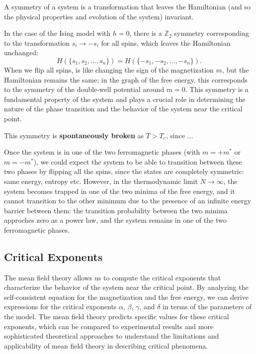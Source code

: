 \begin{remark}
    A symmetry of a system is a transformation that leaves the Hamiltonian (and so the physical properties and evolution of the system) invariant.

    In the case of the Ising model with \(h=0\), there is a \(\mathbb{Z}_2\) symmetry corresponding to the transformation \(s_i \to -s_i\) for all spins, which leaves the Hamiltonian unchanged:
    \[
        H(\{s_1, s_2, \ldots, s_n\}) = H(\{-s_1, -s_2, \ldots, -s_n\}).
    \]
    When we flip all spins, is like changing the sign of the magnetization \(m\), but the Hamiltonian remains the same; in the graph of the free energy, this corresponds to the symmetry of the double-well potential around \(m=0\). This symmetry is a fundamental property of the system and plays a crucial role in determining the nature of the phase transition and the behavior of the system near the critical point.

    This symmetry is \textbf{spontaneously broken} as \(T > T_c\), since ...

    Once the system is in one of the two ferromagnetic phases (with \(m = +m^*\) or \(m = -m^*\)), we could expect the system to be able to transition between these two phases by flipping all the spins, since the states are completely symmetric: same energy, entropy etc. However, in the thermodynamic limit \(N \to \infty\), the system becomes trapped in one of the two minima of the free energy, and it cannot transition to the other minimum due to the presence of an infinite energy barrier between them: the transition probability between the two minima approches zero as a power law, and the system remains in one of the two ferromagnetic phases.
\end{remark}

\subsection{Critical Exponents}

The mean field theory allows us to compute the critical exponents that characterize the behavior of the system near the critical point. By analyzing the self-consistent equation for the magnetization and the free energy, we can derive expressions for the critical exponents \(\alpha\), \(\beta\), \(\gamma\), and \(\delta\) in terms of the parameters of the model. The mean field theory predicts specific values for these critical exponents, which can be compared to experimental results and more sophisticated theoretical approaches to understand the limitations and applicability of mean field theory in describing critical phenomena.


